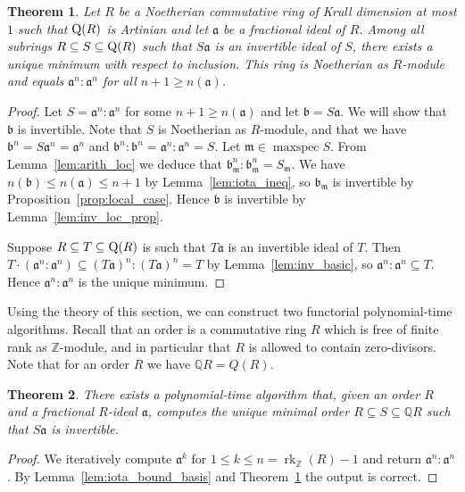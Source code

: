 \documentclass{amsart}
\theoremstyle{plain}
\newtheorem{theorem}{Theorem}[section]
\theoremstyle{definition}
\DeclareMathOperator{\rk}{rk}
\DeclareMathOperator{\maxspec}{maxspec}
\newcommand{\Z}{\ensuremath{\mathbb{Z}}}
\newcommand{\Q}{\ensuremath{\mathbb{Q}}}
\newcommand{\fm}{\ensuremath{\mathfrak{m}}}
\begin{document}
\begin{theorem}\label{thm:main_ideal}
Let \(R\) be a Noetherian commutative ring of Krull dimension at most \(1\) such that \(\textup{Q}(R)\) is Artinian and let \(\mathfrak{a}\) be a fractional ideal of \(R\).
Among all subrings \(R\subseteq S \subseteq\textup{Q}(R)\) such that \(S\mathfrak{a}\) is an invertible ideal of \(S\), there exists a unique minimum with respect to inclusion.
This ring is Noetherian as \(R\)-module and equals \(\mathfrak{a}^{n}:\mathfrak{a}^{n}\) for all \(n+1\geq n(\mathfrak{a})\).
\end{theorem}
\begin{proof}
Let \(S=\mathfrak{a}^n:\mathfrak{a}^n\) for some $n+1\geq n(\mathfrak{a})$ and let \(\mathfrak{b}=S\mathfrak{a}\). 
We will show that \(\mathfrak{b}\) is invertible.
Note that \(S\) is Noetherian as \(R\)-module, and that we have \(\mathfrak{b}^n=S\mathfrak{a}^n=\mathfrak{a}^n\) and \(\mathfrak{b}^n:\mathfrak{b}^n=\mathfrak{a}^n:\mathfrak{a}^n=S\).
Let \(\fm\in\maxspec S\).
From Lemma~\ref{lem:arith_loc} we deduce that \(\mathfrak{b}_\fm^n:\mathfrak{b}_\fm^n=S_\fm\).
We have \(n(\mathfrak{b})\leq n(\mathfrak{a})\leq n+1\) by Lemma~\ref{lem:iota_ineq}, so \(\mathfrak{b}_\fm\) is invertible by Proposition~\ref{prop:local_case}.
Hence \(\mathfrak{b}\) is invertible by Lemma~\ref{lem:inv_loc_prop}.

Suppose \(R\subseteq T \subseteq \textup{Q}(R)\) is such that \(T\mathfrak{a}\) is an invertible ideal of \(T\). Then \(T\cdot (\mathfrak{a}^n:\mathfrak{a}^n) \subseteq (T\mathfrak{a})^n:(T\mathfrak{a})^n = T\) by Lemma~\ref{lem:inv_basic}, so \(\mathfrak{a}^n:\mathfrak{a}^n\subseteq T\). Hence \(\mathfrak{a}^n:\mathfrak{a}^n\) is the unique minimum.  
\end{proof}

Using the theory of this section, we can construct two functorial polynomial-time algorithms. 
Recall that an order is a commutative ring \(R\) which is free of finite rank as \(\Z\)-module, and in particular that $R$ is allowed to contain zero-divisors.
Note that for an order $R$ we have $\Q R=Q(R)$. 

\begin{theorem}\label{thm:blowup}
There exists a polynomial-time algorithm that, given an order \(R\) and a fractional \(R\)-ideal \(\mathfrak{a}\), computes the unique minimal order \(R\subseteq S\subseteq \Q R\) such that \(S\mathfrak{a}\) is invertible.
\end{theorem}
\begin{proof}
We iteratively compute \(\mathfrak{a}^k\) for \(1\leq k\leq n = \rk_\Z(R)-1\) and return \(\mathfrak{a}^n:\mathfrak{a}^n\). 
By Lemma~\ref{lem:iota_bound_basis} and Theorem~\ref{thm:main_ideal} the output is correct.
\end{proof}
\end{document}
